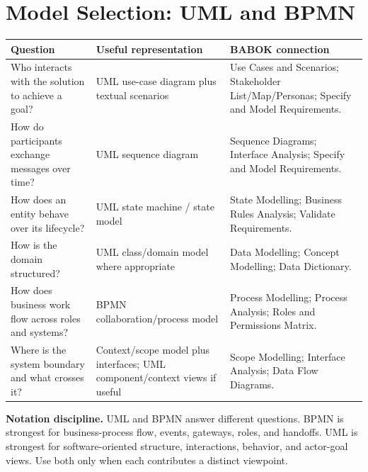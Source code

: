 \documentclass[11pt]{article}
\begin{document}
\section{Model Selection: UML and BPMN}
\begin{longtable}{L{0.20\textwidth} L{0.32\textwidth} L{0.36\textwidth}}
\toprule
\textbf{Question} & \textbf{Useful representation} & \textbf{BABOK connection}\\
\midrule
Who interacts with the solution to achieve a goal? & UML use-case diagram plus textual scenarios & Use Cases and Scenarios; Stakeholder List/Map/Personas; Specify and Model Requirements.\\
How do participants exchange messages over time? & UML sequence diagram & Sequence Diagrams; Interface Analysis; Specify and Model Requirements.\\
How does an entity behave over its lifecycle? & UML state machine / state model & State Modelling; Business Rules Analysis; Validate Requirements.\\
How is the domain structured? & UML class/domain model where appropriate & Data Modelling; Concept Modelling; Data Dictionary.\\
How does business work flow across roles and systems? & BPMN collaboration/process model & Process Modelling; Process Analysis; Roles and Permissions Matrix.\\
Where is the system boundary and what crosses it? & Context/scope model plus interfaces; UML component/context views if useful & Scope Modelling; Interface Analysis; Data Flow Diagrams.\\
\bottomrule
\end{longtable}

\begin{warningbox}
\textbf{Notation discipline.} UML and BPMN answer different questions. BPMN is strongest for business-process flow, events, gateways, roles, and handoffs. UML is strongest for software-oriented structure, interactions, behavior, and actor-goal views. Use both only when each contributes a distinct viewpoint.
\end{warningbox}
\end{document}
